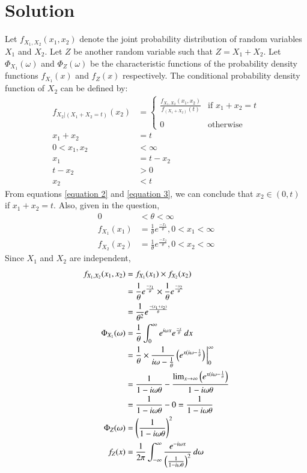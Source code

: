 \documentclass[journal,12pt,twocolumn]{IEEEtran}
\begin{document}
\section*{Solution}
Let $f_{X_1,X_2}(x_1,x_2)$ denote the joint probability distribution of random variables $X_1$ and $X_2$. Let $Z$ be another random variable such that $Z=X_1+X_2$. Let $\Phi_{X_1}(\omega)$ and $\Phi_{Z}(\omega)$ be the characteristic functions of the probability density functions $f_{X_1}(x)$ and $f_{Z}(x)$ respectively. The conditional probability density function of $X_2$ can be defined by:
\begin{align}
    f_{X_2|(X_1+X_2=t)}(x_2) &= 
    \begin{cases}
    \frac{f_{X_1,X_2}(x_1,x_2)}{f_{(X_1+X_2)}(t)} &  \text{if }x_1+x_2=t\\ ~\\[-1em]
    0 & \text{otherwise}
    \end{cases}
    \\ x_1 + x_2 &= t
    \\ 0 < x_1, x_2&< \infty \label{equation 2}
    \\ x_1 &= t-x_2
    \\ t - x_2 &> 0
    \\ x_2 &< t \label{equation 3}
\end{align}
From equations \eqref{equation 2} and \eqref{equation 3}, we can conclude that $x_2 \in (0, t)$ if $x_1+x_2=t$. Also, given in the question,
\begin{align}
    0 &< \theta < \infty
    \\f_{X_1}(x_1) &= \frac{1}{\theta}e^{\frac{-x_1}{\theta}}, 0<x_1<\infty
    \\f_{X_2}(x_2) &= \frac{1}{\theta}e^{\frac{-x_2}{\theta}}, 0<x_2<\infty
\end{align}
Since $X_1$ and $X_2$ are independent, 
\begin{align}
f_{X_1,X_2}(x_1,x_2) &= f_{X_1}(x_1) \times f_{X_2}(x_2)
    \\&= \frac{1}{\theta}e^{\frac{-x_1}{\theta}} \times \frac{1}{\theta}e^{\frac{-x_2}{\theta}}
    \\&= \frac{1}{\theta^2}e^{\frac{-(x_1+x_2)}{\theta}}
    \\\Phi_{X_1}(\omega) &= \frac{1}{\theta} \int_{0}^{\infty}e^{i\omega x} e^{\frac{-x}{\theta}} \,dx
    \\ &= \frac{1}{\theta} \times \frac{1}{i\omega - \frac{1}{\theta}} \left(e^{x(i\omega - \frac{1}{\theta}}\right)\bigg\vert_0^{\infty}
    \\ &= \frac{1}{1-i\omega\theta} - \frac{\lim_{x\rightarrow \infty} \left(e^{x(i\omega - \frac{1}{\theta}}\right)}{1-i\omega\theta}
    \\&= \frac{1}{1-i\omega\theta} - 0 = \frac{1}{1-i\omega\theta} 
    \\ \Phi_{Z}(\omega) &= \left(\frac{1}{1-i\omega\theta} \right)^2
    \\ f_Z(x) &= \frac{1}{2\pi} \int_{-\infty}^{\infty}\frac{e^{-i\omega x}}{\left(\frac{1}{1-i\omega\theta} \right)^2} \,d\omega \label{equation 1}
\end{align}
\end{document}
